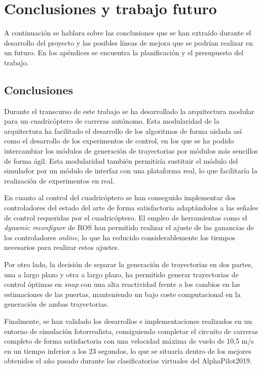 \chapter{Conclusiones y trabajo futuro}

 A continuación se hablara sobre las conclusiones que se han extraído durante el desarrollo del proyecto y las posibles líneas de mejora que se podrían realizar en un futuro. En los apéndices se encuentra la planificación y el presupuesto del trabajo. 


\section{Conclusiones}

Durante el transcurso de este trabajo se ha desarrollado la arquitectura modular para un cuadricóptero de carreras autónomo. Esta modularidad de la arquitectura ha facilitado el desarrollo de los algoritmos de forma aislada así como el desarrollo de los experimentos de control, en los que se ha podido intercambiar los módulos de generación de trayectorias por módulos más sencillos de forma ágil. Esta modularidad también permitiría sustituir el módulo del simulador por un módulo de interfaz con una plataforma real, lo que facilitaría la realización de experimentos en real.

En cuanto al control del cuadricóptero se han conseguido implementar dos controladores del estado del arte de forma satisfactoria adaptándolos a las señales de control requeridas por el cuadricóptero. El empleo de herramientas como el \textit{dynamic reconfigure} de ROS han permitido realizar el ajuste de las ganancias de los controladores \textit{online}, lo que ha reducido considerablemente los tiempos necesarios para realizar estos ajustes.

Por otro lado, la decisión de separar la generación de trayectorias en dos partes, una a largo plazo y otra a largo plazo, ha permitido generar trayectorias de control óptimas en \textit{snap} con una alta reactividad frente a los cambios en las estimaciones de las puertas, manteniendo un bajo coste computacional en la generación de ambas trayectorias.

Finalmente, se han validado los desarrollos e implementaciones realizados en un entorno de simulación fotorrealista, consiguiendo completar el circuito de carreras completo de forma satisfactoria con una velocidad máxima de vuelo de 10,5 m/s en un tiempo inferior a los 23 segundos, lo que se situaría dentro de los mejores obtenidos el año pasado durante las clasificatorias virtuales del AlphaPilot2019.



